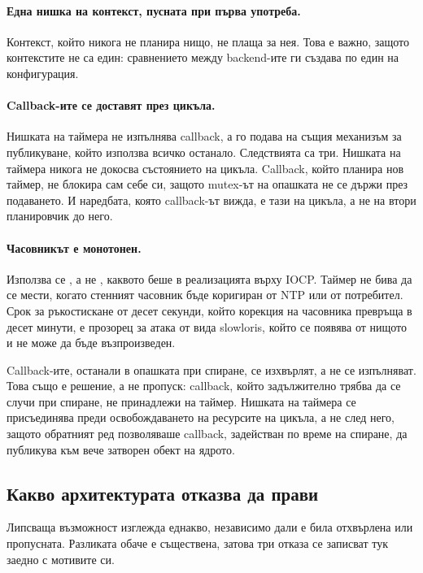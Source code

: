 \paragraph{Една нишка на контекст, пусната при първа употреба.} Контекст, който никога не
планира нищо, не плаща за нея. Това е важно, защото контекстите не са един: сравнението
между backend-ите ги създава по един на конфигурация.

\paragraph{Callback-ите се доставят през цикъла.} Нишката на таймера не изпълнява callback,
а го подава на същия механизъм за публикуване, който използва всичко останало. Следствията
са три. Нишката на таймера никога не докосва състоянието на цикъла. Callback, който планира
нов таймер, не блокира сам себе си, защото mutex-ът на опашката не се държи през подаването.
И наредбата, която callback-ът вижда, е тази на цикъла, а не на втори планировчик до него.

\paragraph{Часовникът е монотонен.} Използва се , а не
, каквото беше в реализацията върху IOCP. Таймер не бива да се мести,
когато стенният часовник бъде коригиран от NTP или от потребител. Срок за ръкостискане от
десет секунди, който корекция на часовника превръща в десет минути, е прозорец за атака от
вида slowloris, който се появява от нищото и не може да бъде възпроизведен.

Callback-ите, останали в опашката при спиране, се изхвърлят, а не се изпълняват. Това също е
решение, а не пропуск: callback, който задължително трябва да се случи при спиране, не
принадлежи на таймер. Нишката на таймера се присъединява преди освобождаването на
ресурсите на цикъла, а не след него, защото обратният ред позволяваше callback, задействан
по време на спиране, да публикува към вече затворен обект на ядрото.

\subsection{Какво архитектурата отказва да прави}
\label{sec:refused}

Липсваща възможност изглежда еднакво, независимо дали е била отхвърлена или пропусната.
Разликата обаче е съществена, затова три отказа се записват тук заедно с мотивите си.

